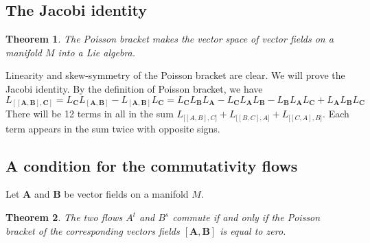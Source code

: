 \documentclass[leqno]{book}
\numberwithin{equation}{section}
\theoremstyle{plain}
\newtheorem*{thm*}{Theorem}
\let\oldendproof\endproof
\renewenvironment{proof}[1][\proofname]{%
  \oldproof[\textsc{#1}]%
}{\oldendproof}
\theoremstyle{definition}
\theoremstyle{remark}
\theoremstyle{smallcap}
\numberwithin{prob}{section}
\begin{document}
\subsection{The Jacobi identity}

\begin{thm*}
  The Poisson bracket  makes the vector space of vector fields on a manifold $M$
  into a Lie algebra.
\end{thm*}

\begin{proof}
  Linearity and skew-symmetry of the Poisson bracket are clear.
  We will prove the Jacobi identity. By the definition of Poisson bracket,
  we have
  $$
  L_\mathbf{ [[A, B], C]} =
  L_{\mathbf C} L_\mathbf{ [A, B] } -L_\mathbf{ [A, B]} L_{\mathbf C}
  =
   L_{\mathbf C} L_{\mathbf B} L_{\mathbf A}
  -L_{\mathbf C} L_{\mathbf A} L_{\mathbf B}
  -L_{\mathbf B} L_{\mathbf A} L_{\mathbf C}
  +L_{\mathbf A} L_{\mathbf B} L_{\mathbf C}
  $$
  There will be 12 terms in all in the sum
  $ L_{\mathbf [[A, B], C]} + L_{\mathbf [[B, C], A]} + L_{\mathbf [[C, A], B]}$.
  Each term appears in the sum twice with opposite signs.
\end{proof}

\subsection{A condition for the commutativity flows}

Let $\mathbf{A}$ and $\mathbf{B}$ be vector fields
on a manifold $M$.

\begin{thm*}
  The two flows $A^t$ and $B^s$ commute if and only if
  the Poisson bracket of the corresponding vectors fields
  $[\mathbf A, \mathbf B]$ is equal to zero.
\end{thm*}
\end{document}
